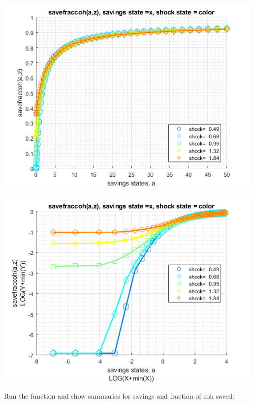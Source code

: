 \documentclass[
]{book}
\begin{document}
\includegraphics[width=5.20833in,height=\textheight]{img/fx_vfi_az_mzoom_vec_images/figure_0.png}

\includegraphics[width=5.20833in,height=\textheight]{img/fx_vfi_az_mzoom_vec_images/figure_1.png}

Run the function and show summaries for savings and fraction of coh
saved:
\end{document}
